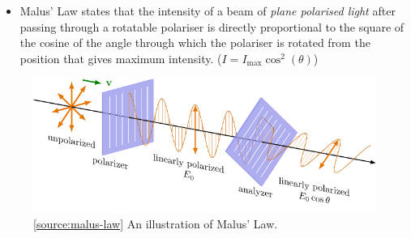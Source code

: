 \documentclass[oneside]{book}
\begin{document}
\begin{minipage}{\textwidth-3cm-15.2363pt}
    \begin{itemize}
        \item Malus' Law states that the intensity of a beam of \emph{plane polarised light} after passing through a rotatable polariser is directly proportional to the square of the cosine of the angle through which the polariser is rotated from the position that gives maximum intensity. (\(I=I_{\text{max}}\cos^2(\theta)\))
    \end{itemize}
\end{minipage}
    \begin{figure}[H]
        \centering
        \includegraphics[width=\textwidth,page=3]{../images/Malus'-Law/Malus'-Law.pdf}
        \caption{\ref{source:malus-law} An illustration of Malus' Law.}
        \label{fig:malus-law}
    \end{figure}
\end{document}
